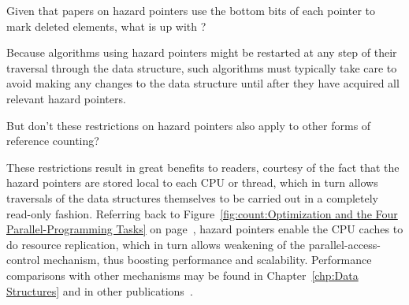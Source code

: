 \QuickQuiz{}
	Given that papers on hazard pointers use the bottom bits
	of each pointer to mark deleted elements, what is up with
	?
 \QuickQuizEnd

Because algorithms using hazard pointers might be restarted at any
step of their traversal through the data structure, such algorithms
must typically take care to avoid making any changes to the data
structure until after they have acquired all relevant hazard pointers.

\QuickQuiz{}
	But don't these restrictions on hazard pointers also apply
	to other forms of reference counting?
 \QuickQuizEnd

These restrictions result in great benefits to readers, courtesy of the
fact that the hazard pointers are stored local to each CPU or thread,
which in turn allows traversals of the data structures themselves to
be carried out in a completely read-only fashion.
Referring back to
Figure~\ref{fig:count:Optimization and the Four Parallel-Programming Tasks}
on
page~\pageref{fig:count:Optimization and the Four Parallel-Programming Tasks},
hazard pointers enable the CPU caches to do resource replication, which
in turn allows weakening of the parallel-access-control mechanism,
thus boosting performance and scalability.
Performance comparisons with other mechanisms may be found in
Chapter~\ref{chp:Data Structures}
and in other publications~\cite{ThomasEHart2007a,McKenney:2013:SDS:2483852.2483867,MagedMichael04a}.

